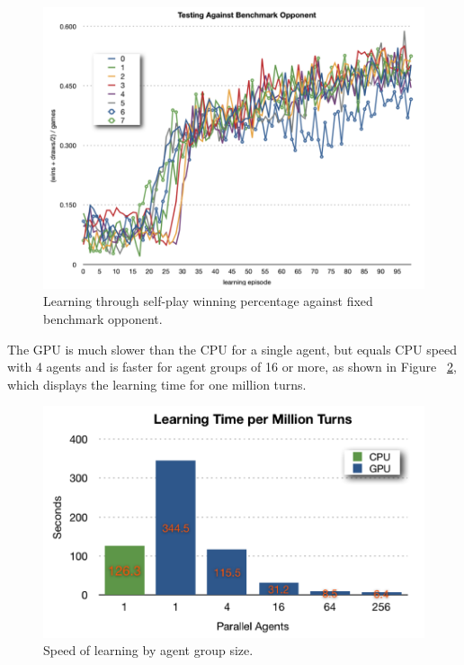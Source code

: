 \begin{figure}[hbtp]
\center
\includegraphics[scale=0.5]{fig13}
\caption{Learning through self-play winning percentage against fixed benchmark opponent.}
\label{fig:sp_learning2}
\end{figure}
\begin{flushleft}



 The GPU is much slower than the CPU for a single agent, but equals CPU speed with 4 agents and is faster for agent groups of 16 or more, as shown in Figure ~\ref{fig:time_per_million}, which displays the learning time for one million turns.

\end{flushleft}
\begin{figure}[hbtp]
\center
\includegraphics[scale=0.8]{fig17}
\caption{Speed of learning by agent group size.}
\label{fig:time_per_million}
\end{figure}

